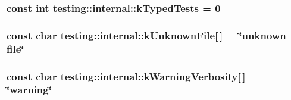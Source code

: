 \subsubsection[{\texorpdfstring{k\+Typed\+Tests}{kTypedTests}}]{\setlength{\rightskip}{0pt plus 5cm}const int testing\+::internal\+::k\+Typed\+Tests = 0}\hypertarget{namespacetesting_1_1internal_a53ee2d113744f9ba1d89469db4d7388b}{}\label{namespacetesting_1_1internal_a53ee2d113744f9ba1d89469db4d7388b}
\subsubsection[{\texorpdfstring{k\+Unknown\+File}{kUnknownFile}}]{\setlength{\rightskip}{0pt plus 5cm}const char testing\+::internal\+::k\+Unknown\+File\mbox{[}$\,$\mbox{]} = \char`\"{}unknown {\bf file}\char`\"{}}\hypertarget{namespacetesting_1_1internal_abae7a5775c901f2fd12b058b00d09840}{}\label{namespacetesting_1_1internal_abae7a5775c901f2fd12b058b00d09840}
\subsubsection[{\texorpdfstring{k\+Warning\+Verbosity}{kWarningVerbosity}}]{\setlength{\rightskip}{0pt plus 5cm}const char testing\+::internal\+::k\+Warning\+Verbosity\mbox{[}$\,$\mbox{]} = \char`\"{}warning\char`\"{}}\hypertarget{namespacetesting_1_1internal_ad9386ccda6b6deac2f7b84784d3088c0}{}\label{namespacetesting_1_1internal_ad9386ccda6b6deac2f7b84784d3088c0}

